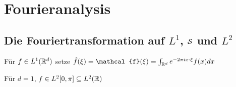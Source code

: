 \chapter*{Fourieranalysis} 

\setcounter{section}{2}

\section{Die Fouriertransformation auf $L^{1}$, $\mathcal{S}$ und $L^{2}$}



\begin{definition}
	Für $f \in L^{1}(\mathbb{R}^{d})$ setze $\hat{f}(\xi) = \mathcal{f}(\xi) = \int_{\R^{d}} e^{-2\pi i x \cdot \xi} f(x) dx$
\end{definition}


\begin{bemerkung*}
 	Für $d = 1$, $f \in L^{2}[0, \pi] \subseteq L^{2}(\mathbb{R})$	
\end{bemerkung*}

